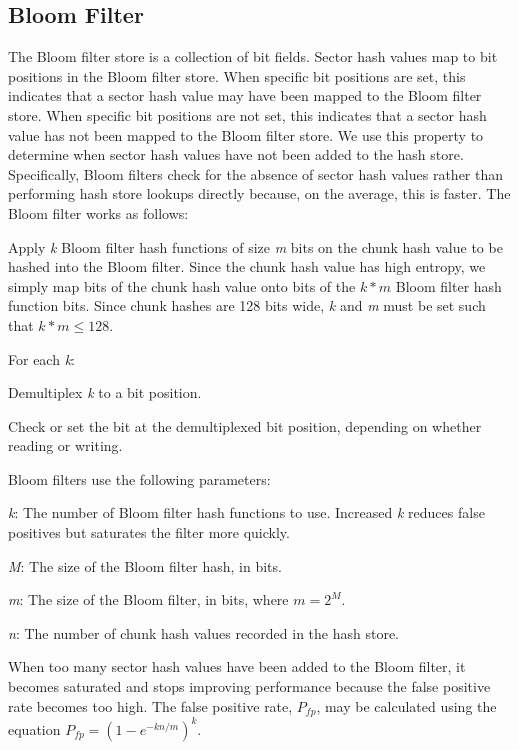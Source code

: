 \documentclass[10pt,twoside]{article}
\begin{document}
\subsection{Bloom Filter\label{tuning-bloom-filter}}
The Bloom filter store is a collection of bit fields.
Sector hash values map to bit positions in the Bloom filter store.
When specific bit positions are set,
this indicates that a sector hash value may have been mapped
to the Bloom filter store.
When specific bit positions are not set,
this indicates that a sector hash value has not been mapped
to the Bloom filter store.
We use this property to determine when sector hash values
have not been added to the hash store.
Specifically, Bloom filters check for the absence of sector hash values
rather than performing hash store lookups directly because, on the average, this is faster.
The Bloom filter works as follows:
\begin{compactenum}
\item Apply \emph{k} Bloom filter hash functions of size \emph{m} bits on the chunk hash value
to be hashed into the Bloom filter.
Since the chunk hash value has high entropy, we simply map bits of the chunk hash value
onto bits of the \begin{math}k*m\end{math} Bloom filter hash function bits.
Since chunk hashes are 128 bits wide, \emph{k} and \emph{m} must be set such that
\begin{math}k*m\le128\end{math}.
\item For each \emph{k}:
\begin{compactenum}
\item Demultiplex \emph{k} to a bit position.
\item Check or set the bit at the demultiplexed bit position,
depending on whether reading or writing.
\end{compactenum}
\end{compactenum}

Bloom filters use the following parameters:
\begin{compactitem}
\item \emph{k}: The number of Bloom filter hash functions to use.
Increased \emph{k} reduces false positives but saturates the filter more quickly.
\item \emph{M}: The size of the Bloom filter hash, in bits.
\item \emph{m}: The size of the Bloom filter, in bits, where \begin{math}m=2^{M}\end{math}.
\item \emph{n}: The number of chunk hash values recorded in the hash store.
\end{compactitem}
When too many sector hash values have been added to the Bloom filter,
it becomes saturated and stops improving performance
because the false positive rate becomes too high.
The false positive rate, \begin{math}P_{fp}\end{math}, may be calculated
using the equation \begin{math}P_{fp}=(1-e^{-kn/m})^k\end{math}.
\end{document}
